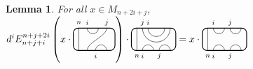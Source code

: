 \documentclass[11pt]{article}
\theoremstyle{plain}
\newtheorem{lem}[thm]{Lemma}
\theoremstyle{definition}
\newcommand{\des}[1]{\marginpar{\tiny \textcolor{purple}{DJC: #1}}}
\begin{document}
 \begin{lem}
 \label{lem:LeftKink}
For all $x \in M_{n+2i+j}$,
$
d^i
E^{n+j+2i}_{n+j+i}
\left(
x
\cdot
\begin{tikzpicture}[baseline = .3cm]
	\draw[thick, rounded corners = 5pt] (0,0) rectangle (1.5,.8);
	\draw (.2,0) -- (.2,.8);
	\draw (.5,.8) arc (-180:0:.2cm);
	\draw (.5,0) .. controls ++(90:.3cm) and ++(270:.3cm) .. (1.2,.8);
	\draw (.8,0) arc (180:0:.2cm);
	\node at (.2,1) {\scriptsize{$n$}};
	\node at (.5,1) {\scriptsize{$i$}};
	\node at (1.2,1) {\scriptsize{$j$}};
	\node at (.8,-.2) {\scriptsize{$i$}};
\end{tikzpicture}
\right)
\cdot
\begin{tikzpicture}[baseline=.3cm]
	\draw[thick, rounded corners = 5pt] (0,0) rectangle (1.6,.8);
	\draw (.2,0) -- (.2,.8);
	\draw (0.4,.8) arc (-180:0:.5);
	\draw (0.6,.8) arc (-180:0:.3);
	\draw (0.4,0) arc (180:0:.2);
	\draw (1,0) arc (180:0:.2);
	\node at (.2,-.2) {\scriptsize{$n$}};
	\node at (.4,1) {\scriptsize{$j$}};
	\node at (.6,1) {\scriptsize{$i$}};
	\node at (.4,-.2) {\scriptsize{$i$}};
	\node at (1,-.2) {\scriptsize{$j$}};
\end{tikzpicture}
=
x\cdot
\begin{tikzpicture}[baseline=.3cm]
	\draw[thick, rounded corners = 5pt] (0,0) rectangle (1.6,.8);
	\draw (.2,0) -- (.2,.8);
	\draw (0.4,0) arc (180:0:.2);
	\draw (1,0) arc (180:0:.2);
	\draw (0.4,.8) arc (-180:0:.2);
	\draw (1,.8) arc (-180:0:.2);
	\node at (.2,-.2) {\scriptsize{$n$}};
	\node at (.4,-.2) {\scriptsize{$i$}};
	\node at (1,-.2) {\scriptsize{$j$}};
	\node at (.4,1) {\scriptsize{$i$}};
	\node at (1,1) {\scriptsize{$j$}};
\end{tikzpicture}
$
\end{lem}
\end{document}

